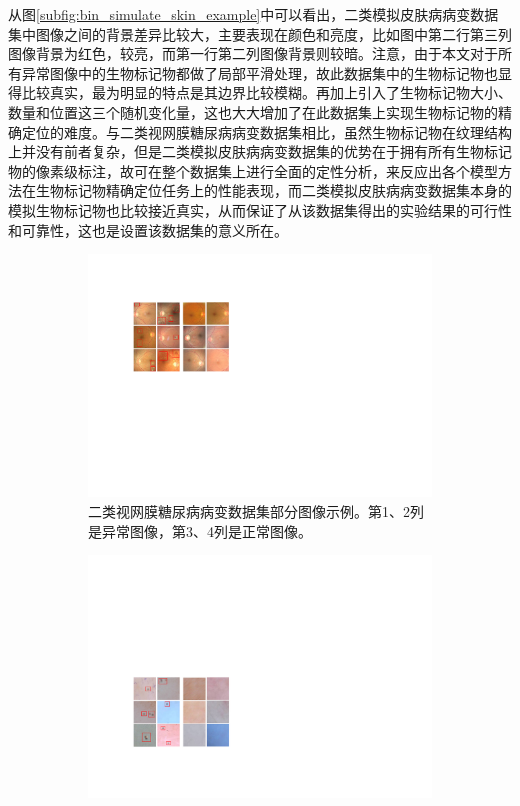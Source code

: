 从图\ref{subfig:bin_simulate_skin_example}中可以看出，二类模拟皮肤病病变数据集中图像之间的背景差异比较大，主要表现在颜色和亮度，比如图中第二行第三列图像背景为红色，较亮，而第一行第二列图像背景则较暗。注意，由于本文对于所有异常图像中的生物标记物都做了局部平滑处理，故此数据集中的生物标记物也显得比较真实，最为明显的特点是其边界比较模糊。再加上引入了生物标记物大小、数量和位置这三个随机变化量，这也大大增加了在此数据集上实现生物标记物的精确定位的难度。与二类视网膜糖尿病病变数据集相比，虽然生物标记物在纹理结构上并没有前者复杂，但是二类模拟皮肤病病变数据集的优势在于拥有所有生物标记物的像素级标注，故可在整个数据集上进行全面的定性分析，来反应出各个模型方法在生物标记物精确定位任务上的性能表现，而二类模拟皮肤病病变数据集本身的模拟生物标记物也比较接近真实，从而保证了从该数据集得出的实验结果的可行性和可靠性，这也是设置该数据集的意义所在。
\begin{figure}[h!]
	\centering
	\begin{subfigure}{0.48\textwidth}
		\centering
		\includegraphics[width=1\textwidth]{figure/bin_dr_ds_example}
		\caption{二类视网膜糖尿病病变数据集部分图像示例。第1、2列是异常图像，第3、4列是正常图像。}
		\label{subfig:bin_dr_ds_example}
	\end{subfigure}
	\quad
	\begin{subfigure}{0.48\textwidth}
		\centering
		\includegraphics[width=1\textwidth]{figure/bin_simulate_skin_example}

\end{subfigure}
\end{figure}
